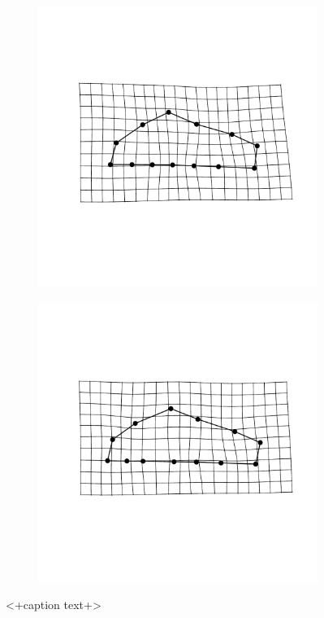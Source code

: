 \documentclass[12pt]{article}\usepackage{graphicx, color}
\begin{document}
\begin{figure}[ht]
  \begin{subfigure}[b]{0.4\textwidth}
    \centering
    \includegraphics[width = \textwidth]{figure/mshape_3}
    \label{fig:mean_shape3}
  \end{subfigure}
  \begin{subfigure}[b]{0.4\textwidth}
    \centering
    \includegraphics[width = \textwidth]{figure/mshape_4}
    \label{fig:mean_shape4}
  \end{subfigure}
  \caption{<+caption text+>}
  \label{fig:mean_shape}
\end{figure}
\end{document}
